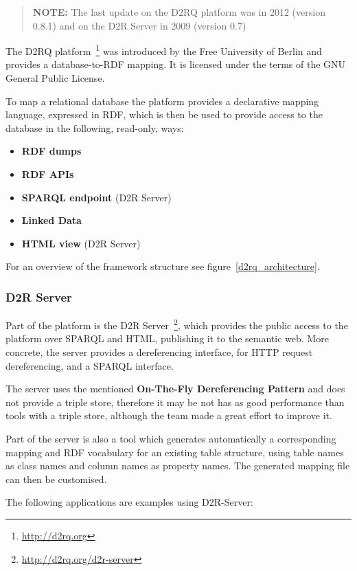 \begin{verse}
\textbf{NOTE:} The last update on the D2RQ platform was in 2012 (version 0.8.1) and on the D2R Server in 2009 (version 0.7)
\end{verse}

The D2RQ platform~\footnote{\url{http://d2rq.org}} was introduced by the Free University of Berlin and provides a database-to-RDF mapping. It is licensed under the terms of the GNU General Public License. 

To map a relational database the platform provides a declarative mapping language, expressed in RDF, which is then be used to provide access to the database in the following, read-only, ways:~\cite{d2rq_w3c}

\begin{itemize}
\item \textbf{RDF dumps}
\item \textbf{RDF APIs}
\item \textbf{SPARQL endpoint} (D2R Server)
\item \textbf{Linked Data}
\item \textbf{HTML view} (D2R Server)
\end{itemize}

For an overview of the framework structure see figure~\ref{d2rq_architecture}.

\subsubsection{D2R Server}
Part of the platform is the D2R Server~\footnote{\url{http://d2rq.org/d2r-server}}, which provides the public access to the platform over SPARQL and HTML, publishing it to the semantic web. More concrete, the server provides a dereferencing interface, for HTTP request dereferencing, and a SPARQL interface. 

The server uses the mentioned \textbf{On-The-Fly Dereferencing Pattern} and does not provide a triple store, therefore it may be not has as good performance than tools with a triple store, although the team made a great effort to improve it.

Part of the server is also a tool which generates automatically a corresponding mapping and RDF vocabulary for an existing table structure, using table names as class names and column names as property names. The generated mapping file can then be customised.~\cite{bizer2006d2r}

The following applications are examples using D2R-Server:

